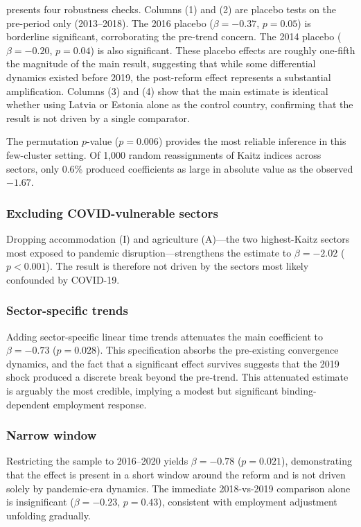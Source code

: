 \documentclass[12pt]{article}
\begin{document}


 presents four robustness checks. Columns (1) and (2) are placebo tests on the pre-period only (2013--2018). The 2016 placebo ($\beta = -0.37$, $p = 0.05$) is borderline significant, corroborating the pre-trend concern. The 2014 placebo ($\beta = -0.20$, $p = 0.04$) is also significant. These placebo effects are roughly one-fifth the magnitude of the main result, suggesting that while some differential dynamics existed before 2019, the post-reform effect represents a substantial amplification. Columns (3) and (4) show that the main estimate is identical whether using Latvia or Estonia alone as the control country, confirming that the result is not driven by a single comparator.

The permutation $p$-value ($p = 0.006$) provides the most reliable inference in this few-cluster setting. Of 1,000 random reassignments of Kaitz indices across sectors, only 0.6\% produced coefficients as large in absolute value as the observed $-1.67$.

\subsubsection*{Excluding COVID-vulnerable sectors} Dropping accommodation (I) and agriculture (A)---the two highest-Kaitz sectors most exposed to pandemic disruption---strengthens the estimate to $\beta = -2.02$ ($p < 0.001$). The result is therefore not driven by the sectors most likely confounded by COVID-19.

\subsubsection*{Sector-specific trends} Adding sector-specific linear time trends attenuates the main coefficient to $\beta = -0.73$ ($p = 0.028$). This specification absorbs the pre-existing convergence dynamics, and the fact that a significant effect survives suggests that the 2019 shock produced a discrete break beyond the pre-trend. This attenuated estimate is arguably the most credible, implying a modest but significant binding-dependent employment response.

\subsubsection*{Narrow window} Restricting the sample to 2016--2020 yields $\beta = -0.78$ ($p = 0.021$), demonstrating that the effect is present in a short window around the reform and is not driven solely by pandemic-era dynamics. The immediate 2018-vs-2019 comparison alone is insignificant ($\beta = -0.23$, $p = 0.43$), consistent with employment adjustment unfolding gradually.
\end{document}
